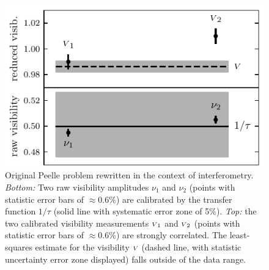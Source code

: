 \documentclass{pasa}
\begin{document}
\begin{figure}
\includegraphics[width=\linewidth]{pdf/original-peelle.pdf}
\caption{Original Peelle problem rewritten in the context of interferometry.  \emph{Bottom:} Two raw visibility amplitudes $\nu_1$ and $\nu_2$ (points with statistic error bars of $\approx 0.6\%$) are calibrated by the transfer function $1/\tau$ (solid line with systematic error zone of 5\%). \emph{Top:} the two calibrated visibility measurements ${\scriptstyle V}_1$ and ${\scriptstyle V}_2$ (points with statistic error bars of $\approx 0.6\%$) are strongly correlated. The least-squares estimate for the visibility ${\scriptstyle V}$ (dashed line, with statistic uncertainty error zone displayed) falls outside of the data range.}
\label{fig:peelle}
\end{figure}
\end{document}
